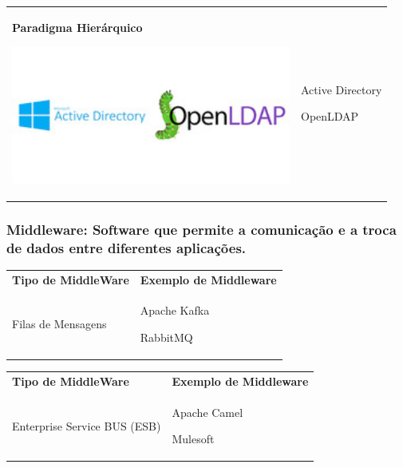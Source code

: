 \documentclass[
]{book}
\begin{document}
\begin{longtable}[]{@{}
  >{\raggedright\arraybackslash}p{}
  >{\centering\arraybackslash}p{}@{}}
\toprule\noalign{}
\endhead
\bottomrule\noalign{}
\endlastfoot
\textbf{Paradigma Hierárquico}

\includegraphics[width=3.625in,height=\textheight]{images/clipboard-1964387230.png} & Active Directory

OpenLDAP \\
\end{longtable}

\subsubsection{Middleware: Software que permite a comunicação e a troca de dados entre diferentes aplicações.}\label{middleware-software-que-permite-a-comunicauxe7uxe3o-e-a-troca-de-dados-entre-diferentes-aplicauxe7uxf5es.}

\begin{longtable}[]{@{}
  >{\centering\arraybackslash}p{}
  >{\centering\arraybackslash}p{}@{}}
\toprule\noalign{}
\endhead
\bottomrule\noalign{}
\endlastfoot
\textbf{Tipo de MiddleWare} & \textbf{Exemplo de Middleware} \\
Filas de Mensagens & Apache Kafka

RabbitMQ \\
\end{longtable}

\begin{longtable}[]{@{}
  >{\centering\arraybackslash}p{}
  >{\centering\arraybackslash}p{}@{}}
\toprule\noalign{}
\endhead
\bottomrule\noalign{}
\endlastfoot
\textbf{Tipo de MiddleWare} & \textbf{Exemplo de Middleware} \\
Enterprise Service BUS (ESB) & Apache Camel

Mulesoft \\
\end{longtable}
\end{document}
